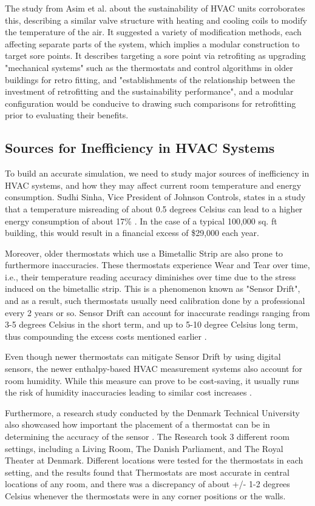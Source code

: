 \documentclass[conference,letterpaper]{IEEEtran}
\begin{document}
The study from Asim et al. about the sustainability of HVAC units \cite{ijerph19021016} corroborates this, describing a similar valve structure with heating and cooling coils to modify the temperature of the air. It suggested a variety of modification methods, each affecting separate parts of the system, which implies a modular construction to target sore points. It describes targeting a sore point via retrofiting as upgrading "mechanical systems" such as the thermostats and control algorithms in older buildings for retro fitting, and "establishments of the relationship between the investment of retrofitting and the sustainability performance", and a modular configuration would be conducive to drawing such comparisons for retrofitting prior to evaluating their benefits.

\subsection{Sources for Inefficiency in HVAC Systems}
To build an accurate simulation, we need to study major sources of inefficiency in HVAC systems, and how they may affect current room temperature and energy consumption. Sudhi Sinha, Vice President of Johnson Controls, states in a study that a temperature misreading of about 0.5 degrees Celsius can lead to a higher energy consumption of about 17\% \cite{Sinha2014}. In the case of a typical 100,000 sq. ft building, this would result in a financial excess of \$29,000 each year.

Moreover, older thermostats which use a Bimetallic Strip are also prone to furthermore inaccuracies. These thermostats experience Wear and Tear over time, i.e., their temperature reading accuracy diminishes over time due to the stress induced on the bimetallic strip. This is a phenomenon known as "Sensor Drift", and as a result, such thermostats usually need calibration done by a professional every 2 years or so. Sensor Drift can account for inaccurate readings ranging from 3-5 degrees Celsius in the short term, and up to 5-10 degree Celsius long term, thus compounding the excess costs mentioned earlier \cite{Luu2021}. 

Even though newer thermostats can mitigate Sensor Drift by using digital sensors, the newer enthalpy-based HVAC measurement systems also account for room humidity. While this measure can prove to be cost-saving, it usually runs the risk of humidity inaccuracies leading to similar cost increases \cite{Luu2021}. 

Furthermore, a research study conducted by the Denmark Technical University also showcased how important the placement of a thermostat can be in determining the accuracy of the sensor \cite{madsen1990a}. The Research took 3 different room settings, including a Living Room, The Danish Parliament, and The Royal Theater at Denmark. Different locations were tested for the thermostats in each setting, and the results found that Thermostats are most accurate in central locations of any room, and there was a discrepancy of about +/- 1-2 degrees Celsius whenever the thermostats were in any corner positions or the walls. 
\end{document}

